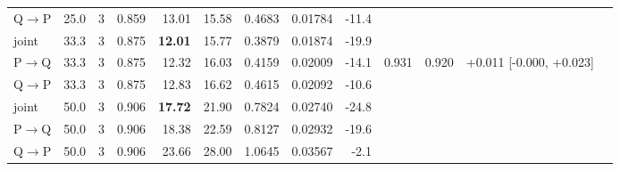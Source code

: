 \documentclass{article}
\begin{document}
\begin{longtable}{llrrrrrrrrrrl}
Q$\to$P & 25.0 & 3 & 0.859 & 13.01 & 15.58 & 0.4683 & 0.01784 & -11.4 &  &  &  \\
joint & 33.3 & 3 & 0.875 & \textbf{12.01} & 15.77 & 0.3879 & 0.01874 & -19.9 &  &  &  \\
P$\to$Q & 33.3 & 3 & 0.875 & 12.32 & 16.03 & 0.4159 & 0.02009 & -14.1 & 0.931 & 0.920 & +0.011 [-0.000, +0.023] \\
Q$\to$P & 33.3 & 3 & 0.875 & 12.83 & 16.62 & 0.4615 & 0.02092 & -10.6 &  &  &  \\
joint & 50.0 & 3 & 0.906 & \textbf{17.72} & 21.90 & 0.7824 & 0.02740 & -24.8 &  &  &  \\
P$\to$Q & 50.0 & 3 & 0.906 & 18.38 & 22.59 & 0.8127 & 0.02932 & -19.6 &  &  &  \\
Q$\to$P & 50.0 & 3 & 0.906 & 23.66 & 28.00 & 1.0645 & 0.03567 & -2.1 &  &  &  \\
\bottomrule\end{longtable}
\end{document}
